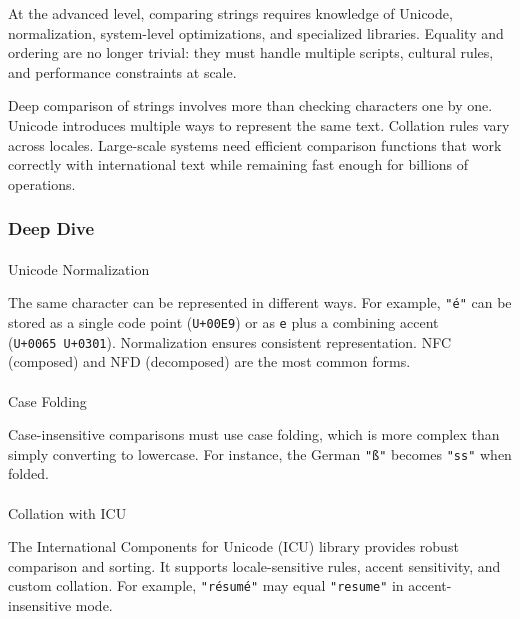 \documentclass[
  letterpaper,
  DIV=11,
  numbers=noendperiod]{scrreprt}
\makeatletter
\let\oldparagraph\paragraph
\renewcommand{\paragraph}{
    \@ifstar
      \xxxParagraphStar
      \xxxParagraphNoStar
  }
\newcommand{\xxxParagraphStar}[1]{\oldparagraph*{#1}\mbox{}}
\newcommand{\xxxParagraphNoStar}[1]{\oldparagraph{#1}\mbox{}}
\makeatother
\begin{document}
At the advanced level, comparing strings requires knowledge of Unicode,
normalization, system-level optimizations, and specialized libraries.
Equality and ordering are no longer trivial: they must handle multiple
scripts, cultural rules, and performance constraints at scale.

Deep comparison of strings involves more than checking characters one by
one. Unicode introduces multiple ways to represent the same text.
Collation rules vary across locales. Large-scale systems need efficient
comparison functions that work correctly with international text while
remaining fast enough for billions of operations.

\subsubsection{Deep Dive}\label{deep-dive-30}

\paragraph{Unicode Normalization}\label{unicode-normalization}

The same character can be represented in different ways. For example,
\texttt{"é"} can be stored as a single code point (\texttt{U+00E9}) or
as \texttt{\textquotesingle{}e\textquotesingle{}} plus a combining
accent (\texttt{U+0065\ U+0301}). Normalization ensures consistent
representation. NFC (composed) and NFD (decomposed) are the most common
forms.

\paragraph{Case Folding}\label{case-folding}

Case-insensitive comparisons must use case folding, which is more
complex than simply converting to lowercase. For instance, the German
\texttt{"ß"} becomes \texttt{"ss"} when folded.

\paragraph{Collation with ICU}\label{collation-with-icu}

The International Components for Unicode (ICU) library provides robust
comparison and sorting. It supports locale-sensitive rules, accent
sensitivity, and custom collation. For example, \texttt{"résumé"} may
equal \texttt{"resume"} in accent-insensitive mode.
\end{document}
